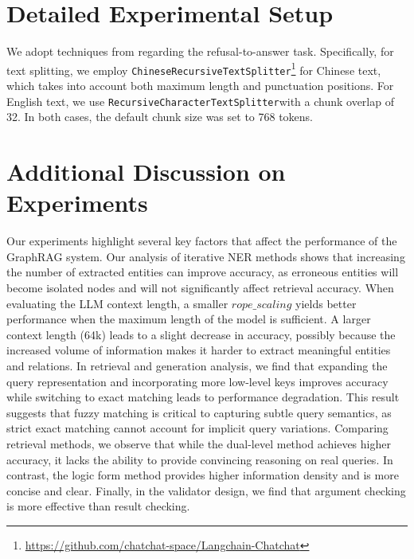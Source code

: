 \documentclass[11pt]{article}
\begin{document}


\section{Detailed Experimental Setup}
\label{sec:B}
We adopt techniques from \cite{kong2024huixiangdou} regarding the refusal-to-answer task. Specifically, for text splitting, we employ \texttt{ChineseRecursiveTextSplitter}\footnote{\url{https://github.com/chatchat-space/Langchain-Chatchat}} for Chinese text, which takes into account both maximum length and punctuation positions. For English text, we use \texttt{RecursiveCharacterTextSplitter}\footnotemark[5] with a chunk overlap of 32. In both cases, the default chunk size was set to 768 tokens.


\section{Additional Discussion on Experiments}
\label{sec:C}
Our experiments highlight several key factors that affect the performance of the GraphRAG system. Our analysis of iterative NER methods shows that increasing the number of extracted entities can improve accuracy, as erroneous entities will become isolated nodes and will not significantly affect retrieval accuracy. When evaluating the LLM context length, a smaller $rope\_scaling$ yields better performance when the maximum length of the model is sufficient. A larger context length (64k) leads to a slight decrease in accuracy, possibly because the increased volume of information makes it harder to extract meaningful entities and relations. In retrieval and generation analysis, we find that expanding the query representation and incorporating more low-level keys improves accuracy while switching to exact matching leads to performance degradation. This result suggests that fuzzy matching is critical to capturing subtle query semantics, as strict exact matching cannot account for implicit query variations. Comparing retrieval methods, we observe that while the dual-level method achieves higher accuracy, it lacks the ability to provide convincing reasoning on real queries. In contrast, the logic form method provides higher information density and is more concise and clear. Finally, in the validator design, we find that argument checking is more effective than result checking.
\end{document}
